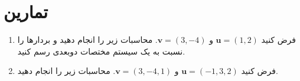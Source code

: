 \section{\textbf{تمارین}}
\label{sec:1.8}
{
    \Large
    \begin{spacing}{1.5}
        \begin{enumerate}[label=\textbf{\arabic*}.]
            \item {فرض کنید $\textbf{u}=(1,2)$ و $\textbf{v}=(3,-4)$. محاسبات زیر را انجام دهید و بردارها را نسبت به یک سیستم مختصات دو‌بعدی رسم کنید.}
            \begin{flushleft}
            \end{flushleft} \textbf{\vspace{-12pt}}

            \item {فرض کنید $\textbf{u}=(-1,3,2)$ و $\textbf{v}=(3,-4,1)$. محاسبات زیر را انجام دهید.}
            \begin{flushleft}
            \end{flushleft} \textbf{\vspace{-12pt}}


\end{enumerate}
\end{spacing}}
